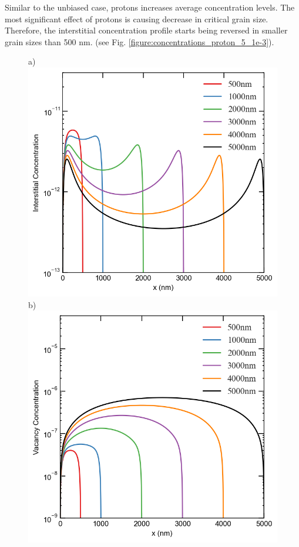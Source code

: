 \documentclass[utf8]{frontiersSCNS} %
\begin{document}
    Similar to the unbiased case, protons increases average concentration levels. The most significant effect of protons is causing decrease in critical grain size. Therefore, the interstitial concentration profile starts being reversed in smaller grain sizes than 500 nm. (see Fig. \ref{figure:concentrations_proton_5_1e-3}).\\
    \begin{figure}[h!]  %
        \centering
        a)\includegraphics[scale=0.55]{interstitial_concentration_500-5000nm-neutron-5}
        b)\includegraphics[scale=0.55]{vacancy_concentration_500-5000nm-neutron-5}

\end{figure}
\end{document}

